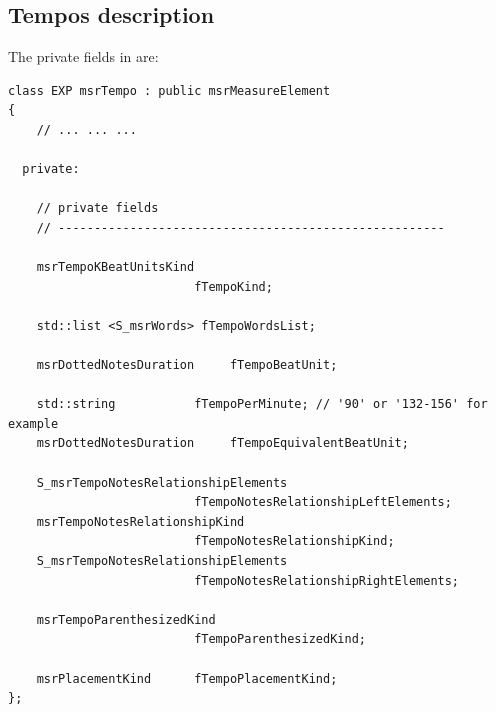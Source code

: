\subsection{Tempos description}\label{Tempos description}

The private fields in  are:
\begin{lstlisting}[language=CPlusPlus]
class EXP msrTempo : public msrMeasureElement
{
	// ... ... ...

  private:

    // private fields
    // ------------------------------------------------------

    msrTempoKBeatUnitsKind
                          fTempoKind;

    std::list <S_msrWords> fTempoWordsList;

    msrDottedNotesDuration     fTempoBeatUnit;

    std::string           fTempoPerMinute; // '90' or '132-156' for example
    msrDottedNotesDuration     fTempoEquivalentBeatUnit;

    S_msrTempoNotesRelationshipElements
                          fTempoNotesRelationshipLeftElements;
    msrTempoNotesRelationshipKind
                          fTempoNotesRelationshipKind;
    S_msrTempoNotesRelationshipElements
                          fTempoNotesRelationshipRightElements;

    msrTempoParenthesizedKind
                          fTempoParenthesizedKind;

    msrPlacementKind      fTempoPlacementKind;
};
\end{lstlisting}

